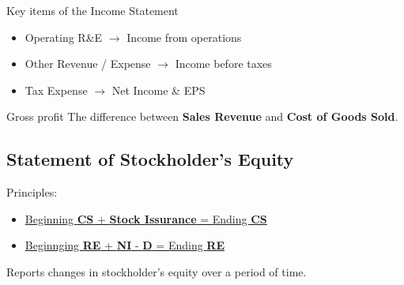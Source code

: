\begin{knBox}
    {Key items of the Income Statement}
    \begin{itemize}
        \item Operating R\&E $\rightarrow$ Income from operations
        \item Other Revenue / Expense $\rightarrow$ Income before taxes
        \item Tax Expense $\rightarrow$ Net Income \& EPS
    \end{itemize}
\end{knBox}

\begin{knBox}
    {Gross profit}
    The difference between \textbf{Sales Revenue} and \textbf{Cost of Goods Sold}.
\end{knBox}

\subsection{Statement of Stockholder's Equity}
\label{sec:statement_se}

Principles:

\begin{itemize}
    \item \hyperref[def:sale_of_stock]{Beginning \textbf{CS} + \textbf{Stock Issurance} = Ending \textbf{CS}}
    \item \hyperref[thm:relations]{Beginnging \textbf{RE} + \textbf{NI} - \textbf{D} = Ending \textbf{RE}}
\end{itemize}


Reports changes in stockholder's equity over a period of time.

\small

